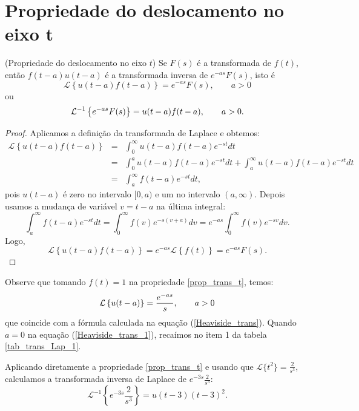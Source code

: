  \section{Propriedade do deslocamento no eixo t}
\begin{teo}{\label{prop_trans_t}}(Propriedade do deslocamento no eixo $t$) Se $F(s)$ é a transformada de $f(t)$, então $f(t-a)u(t-a)$ é a transformada inversa de $e^{-as}F(s)$, isto é
\begin{equation}
\mathcal{L}\left\{u(t-a)f(t-a)\right\} =e^{-as}F(s),\qquad a>0
\end{equation}
ou
\begin{equation}{\label{eq_trans_t_inv}}
\mathcal{L}^{-1} \left\{e^{-as}F(s)\right\} =u(t-a)f(t-a),\qquad a>0.
\end{equation} 
\end{teo}
\begin{proof}Aplicamos a definição da transformada de Laplace e obtemos:
\begin{eqnarray*}
\mathcal{L}\left\{u(t-a)f(t-a)\right\}&=&\int_0^\infty u(t-a)f(t-a)e^{-st}dt\\
&=&\int_0^a u(t-a)f(t-a)e^{-st}dt+\int_a^\infty u(t-a)f(t-a)e^{-st}dt\\
&=&\int_a^\infty f(t-a)e^{-st}dt,
\end{eqnarray*}
pois $u(t-a)$ é zero no intervalo $[0,a)$ e um no intervalo $(a,\infty)$. Depois usamos a mudança de variável $v=t-a$ na última integral:
\begin{equation*}
\int_a^\infty f(t-a)e^{-st}dt=\int_0^\infty f(v)e^{-s(v+a)}dv=e^{-as}\int_0^\infty f(v)e^{-sv}dv.
\end{equation*}
Logo,
\begin{equation}
\mathcal{L}\left\{u(t-a)f(t-a)\right\}=e^{-as}\mathcal{L}\left\{f(t)\right\}=e^{-as}F(s).
\end{equation}
\end{proof}
Observe que tomando $f(t)=1$ na propriedade \ref{prop_trans_t}, temos:
\begin{equation}{\label{Heaviside_trans_1}}
\mathcal{L}\left\{u(t-a)\right\} =\frac{e^{-as}}{s},\qquad a>0
\end{equation}
que coincide com a fórmula calculada na equação (\ref{Heaviside_trans}). Quando $a=0$ na equação (\ref{Heaviside_trans_1}), recaímos no item 1 da tabela \ref{tab_trans_Lap_1}.
\begin{ex} Aplicando diretamente a propriedade \ref{prop_trans_t} e usando que $\mathcal{L}\{t^2\}=\frac{2}{s^3}$, calculamos a transformada inversa de Laplace de $e^{-3s}\frac{2}{s^3}$:
\begin{equation}
\mathcal{L}^{-1}\left\{e^{-3s}\frac{2}{s^3}\right\}=u(t-3)(t-3)^2.
\end{equation}
\end{ex}
